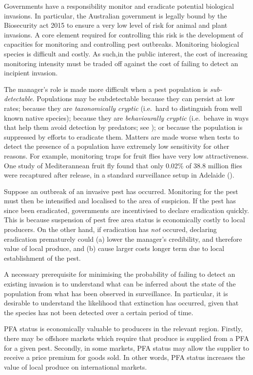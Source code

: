 \documentclass[
]{book}
\begin{document}
Governments have a responsibility monitor and eradicate potential biological invasions. In particular, the Australian government is legally bound by the Biosecurity act 2015 to ensure a very low level of risk for animal and plant invasions. A core element required for controlling this risk is the development of capacities for monitoring and controlling pest outbreaks. Monitoring biological species is difficult and costly. As such,in the public interest, the cost of increasing monitoring intensity must be traded off against the cost of failing to detect an incipient invasion.

The manager's role is made more difficult when a pest population is \emph{sub-detectable}. Populations may be subdetectable because they can persist at low rates; because they are \emph{taxonomically cryptic} (i.e.~hard to distinguish from well known native species); because they are \emph{behaviourally cryptic} (i.e.~behave in ways that help them avoid detection by predators; see \citet{kery2002}); or because the population is suppressed by efforts to eradicate them. Matters are made worse when tests to detect the presence of a population have extremely low sensitivity for other reasons. For example, monitoring traps for fruit flies have very low attractiveness. One study of Mediterannean fruit fly found that only 0.02\% of 38.8 million flies were recaptured after release, in a standard surveillance setup in Adelaide (\citet{ms2007}).

Suppose an outbreak of an invasive pest has occurred. Monitoring for the pest must then be intensified and localised to the area of suspicion. If the pest has since been eradicated, governments are incentivised to declare eradication quickly. This is because suspension of pest free area status is economically costly to local producers. On the other hand, if eradication has \emph{not} occured, declaring eradication prematurely could (a) lower the manager's credibility, and therefore value of local produce, and (b) cause larger costs longer term due to local establishment of the pest.

A necessary prerequisite for minimising the probability of failing to detect an existing invasion is to understand what can be inferred about the state of the population from what has been observed in surveillance. In particular, it is desirable to understand the likelihood that extinction has occurred, given that the species has not been detected over a certain period of time.

PFA status is economically valuable to producers in the relevant region. Firstly, there may be offshore markets which require that produce is supplied from a PFA for a given pest. Secondly, in some markets, PFA status may allow the supplier to receive a price premium for goods sold. In other words, PFA status increases the value of local produce on international markets.
\end{document}
